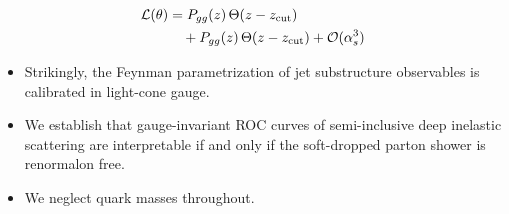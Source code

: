 \begin{align}
  \mathcal{L}(\theta) &= P_{gg}(z) \, \Theta(z - z_{\rm cut}) \nonumber \\
  &\quad + P_{gg}(z) \, \Theta(z - z_{\rm cut}) + \mathcal{O}(\alpha_s^3) \label{eq:2}
\end{align}

\begin{itemize}
  \item Strikingly, the Feynman parametrization of jet substructure observables is calibrated in light-cone gauge.
  \item We establish that gauge-invariant ROC curves of semi-inclusive deep inelastic scattering are interpretable if and only if the soft-dropped parton shower is renormalon free.
  \item We neglect quark masses throughout.
\end{itemize}

